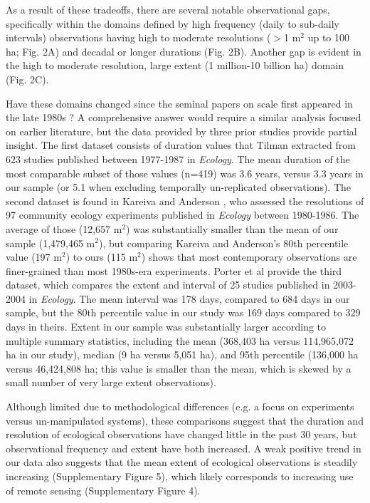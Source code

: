 \documentclass[12pt]{article}
\begin{document}
As a result of these tradeoffs, there are several notable observational gaps, specifically within the domains defined by high frequency (daily to sub-daily intervals) observations having high to moderate resolutions ($>$1 m$^2$ up to 100 ha; Fig. 2A) and decadal or longer durations (Fig. 2B).  Another gap is evident in the high to moderate resolution, large extent (1 million-10 billion ha) domain (Fig. 2C). 

Have these domains changed since the seminal papers on scale first appeared in the late 1980s \cite{wiens_spatial_1989, levin_problem_1992, tilman_ecological_1989}? A comprehensive answer would require a similar analysis focused on earlier literature, but the data provided by three prior studies provide partial insight.  The first dataset consists of duration values that Tilman \cite{tilman_ecological_1989} extracted from 623 studies published between 1977-1987 in \emph{Ecology}. The mean duration of the most comparable subset of those values (n=419) was 3.6 years, versus 3.3 years in our sample (or 5.1 when excluding temporally un-replicated observations). The second dataset is found in Kareiva and Anderson \cite{kareiva_spatial_1988}, who assessed the resolutions of 97 community ecology experiments published in \emph{Ecology} between 1980-1986. The average of those (12,657 m$^2$) was substantially smaller than the mean of our sample (1,479,465 m$^2$), but comparing Kareiva and Anderson's \cite{kareiva_spatial_1988} 80th percentile value (197 m$^2$) to ours (115 m$^2$) shows that most contemporary observations are finer-grained than most 1980s-era experiments. Porter et al \cite{porter_wireless_2005} provide the third dataset, which compares the extent and interval of 25 studies published in 2003-2004 in \emph{Ecology}. The mean interval was 178 days, compared to 684 days in our sample, but the 80th percentile value in our study was 169 days compared to 329 days in theirs. Extent in our sample was substantially larger according to multiple summary statistics, including the mean (368,403 ha versus 114,965,072 ha in our study), median (9 ha versus 5,051 ha), and 95th percentile (136,000 ha versus 46,424,808 ha; this value is smaller than the mean, which is skewed by a small number of very large extent observations). 

Although limited due to methodological differences (e.g. a focus on experiments versus un-manipulated systems), these comparisons suggest that the duration and resolution of ecological observations have changed little in the past 30 years, but observational frequency and extent have both increased. A weak positive trend in our data also suggests that the mean extent of ecological observations is steadily increasing (Supplementary Figure 5), which likely corresponds to increasing use of remote sensing (Supplementary Figure 4). 
\end{document}
